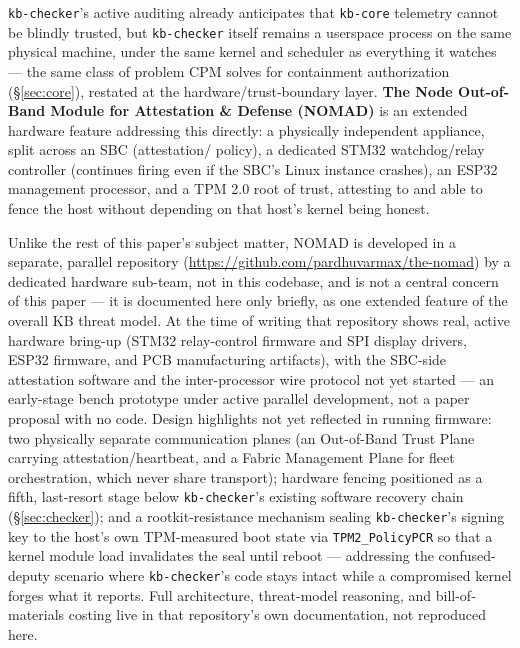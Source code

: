 \documentclass{article}
\begin{document}
\texttt{kb-checker}'s active auditing already anticipates that
\texttt{kb-core} telemetry cannot be blindly trusted, but
\texttt{kb-checker} itself remains a userspace process on the same
physical machine, under the same kernel and scheduler as everything it
watches --- the same class of problem CPM solves for containment
authorization (\S\ref{sec:core}), restated at the hardware/trust-boundary
layer. \textbf{The Node Out-of-Band Module for Attestation \& Defense
(NOMAD)} is an extended hardware feature addressing this directly: a
physically independent appliance, split across an SBC (attestation/
policy), a dedicated STM32 watchdog/relay controller (continues firing
even if the SBC's Linux instance crashes), an ESP32 management
processor, and a TPM 2.0 root of trust, attesting to and able to fence
the host without depending on that host's kernel being honest.

Unlike the rest of this paper's subject matter, NOMAD is developed in
a separate, parallel repository (\mbox{\url{https://github.com/pardhuvarmax/the-nomad}})
by a dedicated hardware sub-team, not in this codebase, and is not a
central concern of this paper --- it is documented here only briefly, as one extended
feature of the overall KB threat model. At the time of writing that
repository shows real, active hardware bring-up (STM32 relay-control
firmware and SPI display drivers, ESP32 firmware, and PCB manufacturing
artifacts), with the SBC-side attestation software and the
inter-processor wire protocol not yet started --- an early-stage bench
prototype under active parallel development, not a paper proposal with
no code. Design highlights not yet reflected in running firmware: two
physically separate communication planes (an Out-of-Band Trust Plane
carrying attestation/heartbeat, and a Fabric Management Plane for
fleet orchestration, which never share transport); hardware fencing
positioned as a fifth, last-resort stage below \texttt{kb-checker}'s
existing software recovery chain (\S\ref{sec:checker}); and a
rootkit-resistance mechanism sealing \texttt{kb-checker}'s signing key
to the host's own TPM-measured boot state via \texttt{TPM2\_PolicyPCR}
\citep{tcg2019tpm, sailer2004design} so that a kernel module load
invalidates the seal until reboot --- addressing the confused-deputy
scenario \citep{hardy1988confused} where \texttt{kb-checker}'s code
stays intact while a compromised kernel forges what it reports. Full
architecture, threat-model reasoning, and bill-of-materials costing
live in that repository's own documentation, not reproduced here.
\end{document}
